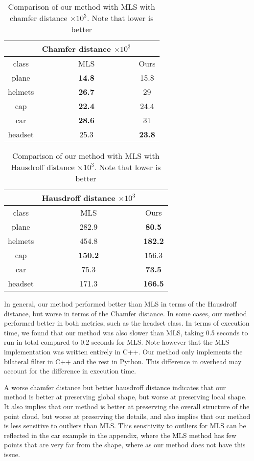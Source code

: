 \begin{table}[H]
\centering
\begin{tabular}{ccc}
	& Chamfer distance $\times 10^3$ &\\
	\hline
	class & MLS & Ours \\
	\hline
	plane & \textbf{14.8} & 15.8 \\ 
	helmets & \textbf{26.7} & 29 \\
	cap & \textbf{22.4} & 24.4 \\  
	car & \textbf{28.6} & 31 \\  
	headset & {25.3} & \textbf{23.8}  \\
\end{tabular}
\caption{Comparison of our method with MLS with chamfer distance $\times 10^3$. Note that lower is better}
\end{table}

\begin{table}[H]
\centering
\begin{tabular}{ccc}
	& Hausdroff distance $\times 10^3$ &\\
	\hline
	class & MLS & Ours \\
	\hline
	plane & 282.9 & \textbf{80.5} \\ 
helmets & 454.8 &  \textbf{182.2}\\
cap & \textbf{150.2} & 156.3 \\ 
car & 75.3 & \textbf{73.5} \\  
headset & 171.3 & \textbf{166.5} \\
\end{tabular}
\caption{Comparison of our method with MLS with Hausdroff distance $\times 10^3$. Note that lower is better}
\end{table}

In general, our method performed better than MLS in terms of the Hausdroff distance, but worse in terms of the Chamfer distance.
In some cases, our method performed better in both metrics, such as the headset class.
In terms of execution time, we found that our method was also slower than MLS, taking 0.5 seconds to run in total compared to 0.2 seconds for MLS.
Note however that the MLS implementation was written entirely in C++. Our method only implements the bilateral filter in C++ and the rest in Python. 
This difference in overhead may account for the difference in execution time.

A worse chamfer distance but better hausdroff distance indicates that our method is better at preserving global shape, but worse at preserving local shape.
It also implies that our method is better at preserving the overall structure of the point cloud, but worse at preserving the details, and also implies that our method is less sensitive to outliers than MLS.
This sensitivity to outliers for MLS can be reflected in the car example in the appendix, where the MLS method has few points that are very far from the shape, where as our method does not have this issue.


